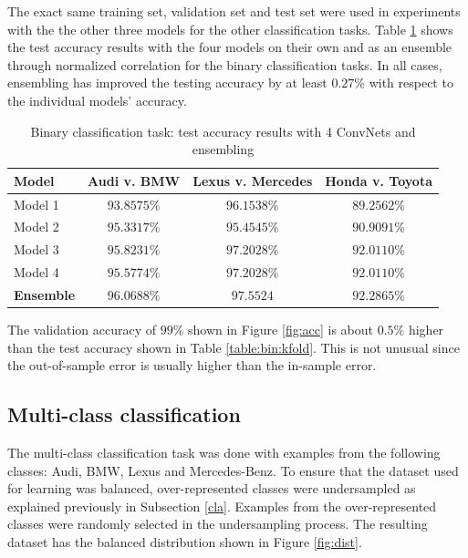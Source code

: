 \documentclass[conference]{IEEEtran}
\begin{document}
The exact same training set, validation set and test set were used in experiments with the the other three models for the other classification tasks. Table \ref{table:bin:ensem} shows the test accuracy results with the four models on their own and as an ensemble through normalized correlation for the binary classification tasks. In all cases, ensembling has improved the testing accuracy by at least $0.27\%$ with respect to the individual models' accuracy.

\begin{table}[t]
	\caption{Binary classification task: test accuracy results with 4 ConvNets and ensembling} \label{table:bin:ensem}
	\centering
\begin{tabular}{| l | c| c| c|}
\hline
\textbf{Model} & \textbf{Audi v. BMW} & \textbf{Lexus v. Mercedes}  &  \textbf{Honda v. Toyota}\\
\hline \hline
Model 1  &  $93.8575\%$ & $96.1538\%$ & $89.2562\%$\\ \hline
Model 2  &  $95.3317\%$ & $95.4545\%$ & $90.9091\%$ \\ \hline 
Model 3  &  $95.8231\%$ & $97.2028\%$ & $92.0110\%$ \\ \hline 
Model 4  &  $95.5774\%$ & $97.2028\%$ & $92.0110\%$  \\ \hline 
\textbf{Ensemble} &  $\bm{96.0688\%}$ & $\bm{97.5524}$ & $\bm{92.2865\%}$ \\ \hline
\end{tabular}
\end{table}

The validation accuracy of $99\%$ shown in Figure \ref{fig:acc} is about $0.5\%$ higher than the test accuracy shown in Table \ref{table:bin:kfold}. This is not unusual since the out-of-sample error is usually higher than the in-sample error.

\subsection{Multi-class classification}
The multi-class classification task was done with examples from the following classes: Audi, BMW, Lexus and Mercedes-Benz. To ensure that the dataset used for learning was balanced, over-represented classes were undersampled as explained previously in Subsection \ref{cla}. Examples from the over-represented classes were randomly selected in the undersampling process. The resulting dataset has the balanced distribution shown in Figure \ref{fig:dist}.
\end{document}
